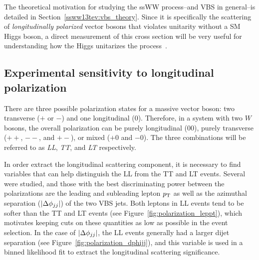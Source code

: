 The theoretical motivation for studying the ssWW process--and VBS in general--is detailed in Section~\ref{ssww13tev:vbs_theory}.
Since it is specifically the scattering of \emph{longitudinally polarized} vector bosons that violates unitarity without a SM Higgs boson, a direct measurement of this cross section will be very useful for understanding how the Higgs unitarizes the process~\cite{2013.longitudinal-theory}.


\subsection{Experimental sensitivity to longitudinal polarization}\label{sec:sswwupgrade_longitudinal_sens}
There are three possible polarization states for a massive vector boson: two transverse ($+$ or $-$) and one longitudinal ($0$).
Therefore, in a system with two $W$ bosons, the overall polarization can be purely longitudinal ($00$), purely transverse ($++$, $--$, and $+-$), or mixed ($+0$ and $-0$).
The three combinations will be referred to as \emph{LL}, \emph{TT}, and \emph{LT} respectively.

In order extract the longitudinal scattering component, it is necessary to find variables that can help distinguish the LL from the TT and LT events.
Several were studied, and those with the best discriminating power between the polarizations are the leading and subleading lepton $p_{\mathrm{T}}$ as well as the azimuthal separation ($|\Delta\phi_{jj}|$) of the two VBS jets.
Both leptons in LL events tend to be softer than the TT and LT events (see Figure~\ref{fig:polarization_leppt}), which motivates keeping cuts on these quantities as low as possible in the event selection.%
In the case of $|\Delta\phi_{jj}|$, the LL events generally had a larger dijet separation (see Figure~\ref{fig:polarization_dphijj}), and this variable is used in a binned likelihood fit to extract the longitudinal scattering significance.

